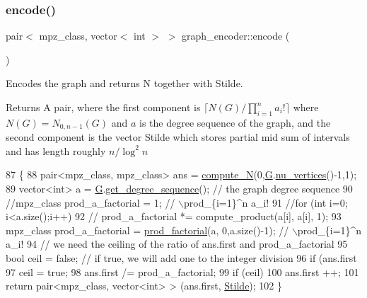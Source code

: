 \mbox{\label{classgraph__encoder_a674380f767d1b635f30444f3b499c544}} 
\subsubsection{\texorpdfstring{encode()}{encode()}}
{\footnotesize\ttfamily pair$<$ mpz\+\_\+class, vector$<$ int $>$ $>$ graph\+\_\+encoder\+::encode (\begin{DoxyParamCaption}{ }\end{DoxyParamCaption})}



Encodes the graph and returns N together with Stilde. 

\begin{DoxyReturn}{Returns}
A pair, where the first component is $\lceil N(G) / \prod_{i=1}^n a_i! \rceil$ where $N(G) = N_{0,n-1}(G)$ and $a$ is the degree sequence of the graph, and the second component is the vector Stilde which stores partial mid sum of intervals and has length roughly $n / \log^2 n$ 
\end{DoxyReturn}

\begin{DoxyCode}
87                                                    \{
88   pair<mpz\_class, mpz\_class> ans  = \hyperlink{classgraph__encoder_ad2f997218e6527b869166e778c79672c}{compute\_N}(0,\hyperlink{classgraph__encoder_a56d8ab1a423e192c6f80514ff5e5cfec}{G}.\hyperlink{classgraph_a70a6e0e4e0a874ab122405abd38f83cd}{nu\_vertices}()-1,1);
89   vector<int> a = \hyperlink{classgraph__encoder_a56d8ab1a423e192c6f80514ff5e5cfec}{G}.\hyperlink{classgraph_afdca627df7fb93a7d1d8a547f616e948}{get\_degree\_sequence}();  \textcolor{comment}{// the graph degree sequence}
90   \textcolor{comment}{//mpz\_class prod\_a\_factorial = 1; // \(\backslash\)prod\_\{i=1\}^n a\_i!}
91   \textcolor{comment}{//for (int i=0; i<a.size();i++)}
92   \textcolor{comment}{//  prod\_a\_factorial *= compute\_product(a[i], a[i], 1);}
93   mpz\_class prod\_a\_factorial = \hyperlink{compression__helper_8cpp_a86d8a20e022dc06b23df3b08ac10b7d1}{prod\_factorial}(a, 0,a.size()-1); \textcolor{comment}{// \(\backslash\)prod\_\{i=1\}^n a\_i!}
94   \textcolor{comment}{// we need the ceiling of the ratio of ans.first and prod\_a\_factorial}
95   \textcolor{keywordtype}{bool} ceil = \textcolor{keyword}{false}; \textcolor{comment}{// if true, we will add one to the integer division}
96   \textcolor{keywordflow}{if} (ans.first %
97     ceil = \textcolor{keyword}{true};
98   ans.first /= prod\_a\_factorial;
99   \textcolor{keywordflow}{if} (ceil)
100     ans.first ++;
101   \textcolor{keywordflow}{return} pair<mpz\_class, vector<int> > (ans.first, \hyperlink{classgraph__encoder_a342688a3fdee511b7fae3f155cfb10cf}{Stilde});
102 \}
\end{DoxyCode}
\mbox{\label{classgraph__encoder_a197200e714da86ec133ab07bb45e5313}} 
